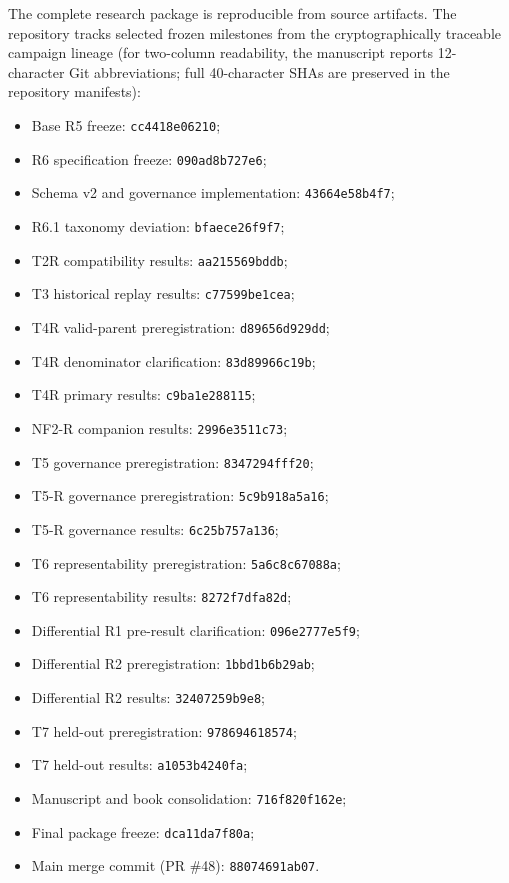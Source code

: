 \documentclass[conference]{IEEEtran}
\begin{document}
The complete research package is reproducible from source artifacts. The repository tracks selected frozen milestones from the cryptographically traceable campaign lineage (for two-column readability, the manuscript reports 12-character Git abbreviations; full 40-character SHAs are preserved in the repository manifests):
\begin{itemize}
\item Base R5 freeze: \texttt{cc4418e06210};
\item R6 specification freeze: \texttt{090ad8b727e6};
\item Schema v2 and governance implementation: \texttt{43664e58b4f7};
\item R6.1 taxonomy deviation: \texttt{bfaece26f9f7};
\item T2R compatibility results: \texttt{aa215569bddb};
\item T3 historical replay results: \texttt{c77599be1cea};
\item T4R valid-parent preregistration: \texttt{d89656d929dd};
\item T4R denominator clarification: \texttt{83d89966c19b};
\item T4R primary results: \texttt{c9ba1e288115};
\item NF2-R companion results: \texttt{2996e3511c73};
\item T5 governance preregistration: \texttt{8347294fff20};
\item T5-R governance preregistration: \texttt{5c9b918a5a16};
\item T5-R governance results: \texttt{6c25b757a136};
\item T6 representability preregistration: \texttt{5a6c8c67088a};
\item T6 representability results: \texttt{8272f7dfa82d};
\item Differential R1 pre-result clarification: \texttt{096e2777e5f9};
\item Differential R2 preregistration: \texttt{1bbd1b6b29ab};
\item Differential R2 results: \texttt{32407259b9e8};
\item T7 held-out preregistration: \texttt{978694618574};
\item T7 held-out results: \texttt{a1053b4240fa};
\item Manuscript and book consolidation: \texttt{716f820f162e};
\item Final package freeze: \texttt{dca11da7f80a};
\item Main merge commit (PR \#48): \texttt{88074691ab07}.
\end{itemize}
\end{document}
